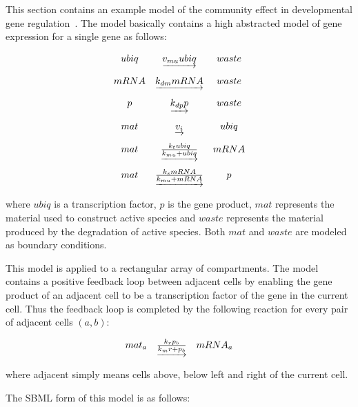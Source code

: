 \documentclass{cekarticle}
\begin{document}
This section contains an example model of the community effect in
developmental gene regulation~\citep{gurdon:1988}. The model basically contains a
high abstracted model of gene expression for a single gene as follows:

\begin{equation*}
  \begin{array}{@{}ccc@{}}
    ubiq & \underrightarrow{v_{mu} ubiq} & waste \\ \\[-4pt]
    mRNA & \underrightarrow{k_{dm} mRNA} & waste \\ \\[-4pt]
    p & \underrightarrow{k_{dp} p} & waste \\ \\[-4pt]
    mat & \underrightarrow{v_i} & ubiq \\ \\[-4pt]
    mat & \underrightarrow{\frac{k_t ubiq}{k_{mu} + ubiq}} & mRNA \\ \\[-4pt]
    mat & \underrightarrow{\frac{k_s mRNA}{k_{mu} + mRNA}} & p
  \end{array}
\end{equation*}

where $ubiq$ is a transcription factor, $p$ is the gene product,
$mat$ represents the material used to construct active species and
$waste$ represents the material produced by the degradation of
active species.  Both $mat$ and $waste$ are modeled as boundary
conditions.

This model is applied to a rectangular array of compartments. The
model contains a positive feedback loop between adjacent cells by
enabling the gene product of an adjacent cell to be a
transcription factor of the gene in the current cell. Thus the
feedback loop is completed by the following reaction for every
pair of adjacent cells $(a,b)$:

\begin{equation*}
  \begin{array}{@{}ccc@{}}
    mat_a & \underrightarrow{\frac{k_r p_b}{k_mr + p_b}} & mRNA_a
  \end{array}
\end{equation*}

where adjacent simply means cells above, below left and right of
the current cell.

The SBML form of this model is as follows:
\end{document}

